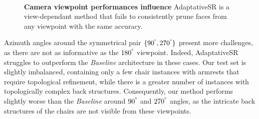 \begin{figure}[h!]
  \centering
   \\
  \caption{\textbf{Camera viewpoint performances influence} AdaptativeSR is a view-dependant method that fails to consistently prune faces from any viewpoint with the same accuracy.} 
  \label{fig:pruning_viewpoint_influence}
\end{figure}

Azimuth angles around the symmetrical pair $\{90^{\degree}, 270^{\degree}\}$ present more challenges, as there are not as informative as the $180^{\degree}$ viewpoint. Indeed, AdaptativeSR struggles to outperform the \textit{Baseline} architecture in these cases. Our test set is slightly imbalanced, containing only a few chair instances with armrests that require topological refinement, while there is a greater number of instances with topologically complex back structures. Consequently, our method performs slightly worse than the \textit{Baseline} around $90^{\degree}$ and $270^{\degree}$ angles, as the intricate back structures of the chairs are not visible from these viewpoints. 

